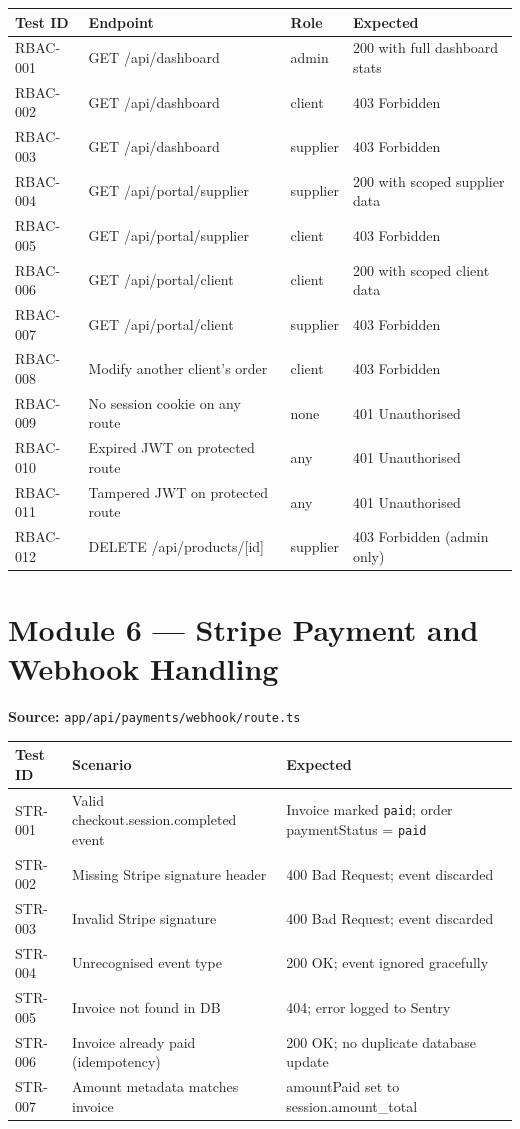 \documentclass[12pt,a4paper]{report}
\begin{document}
\begin{longtable}{p{}p{}p{}p{}}
    \toprule
    \textbf{Test ID} & \textbf{Endpoint} & \textbf{Role} & \textbf{Expected} \\
    \midrule
    \endhead
    RBAC-001 & GET /api/dashboard & admin & 200 with full dashboard stats \\
    RBAC-002 & GET /api/dashboard & client & 403 Forbidden \\
    RBAC-003 & GET /api/dashboard & supplier & 403 Forbidden \\
    RBAC-004 & GET /api/portal/supplier & supplier & 200 with scoped supplier data \\
    RBAC-005 & GET /api/portal/supplier & client & 403 Forbidden \\
    RBAC-006 & GET /api/portal/client & client & 200 with scoped client data \\
    RBAC-007 & GET /api/portal/client & supplier & 403 Forbidden \\
    RBAC-008 & Modify another client's order & client & 403 Forbidden \\
    RBAC-009 & No session cookie on any route & none & 401 Unauthorised \\
    RBAC-010 & Expired JWT on protected route & any & 401 Unauthorised \\
    RBAC-011 & Tampered JWT on protected route & any & 401 Unauthorised \\
    RBAC-012 & DELETE /api/products/[id] & supplier & 403 Forbidden (admin only) \\
    \bottomrule
\end{longtable}

\section{Module 6 --- Stripe Payment and Webhook Handling}

\textbf{Source:} \texttt{app/api/payments/webhook/route.ts}

\begin{longtable}{p{}p{}p{}}
    \toprule
    \textbf{Test ID} & \textbf{Scenario} & \textbf{Expected} \\
    \midrule
    \endhead
    STR-001 & Valid checkout.session.completed event & Invoice marked \texttt{paid}; order paymentStatus = \texttt{paid} \\
    STR-002 & Missing Stripe signature header & 400 Bad Request; event discarded \\
    STR-003 & Invalid Stripe signature & 400 Bad Request; event discarded \\
    STR-004 & Unrecognised event type & 200 OK; event ignored gracefully \\
    STR-005 & Invoice not found in DB & 404; error logged to Sentry \\
    STR-006 & Invoice already paid (idempotency) & 200 OK; no duplicate database update \\
    STR-007 & Amount metadata matches invoice & amountPaid set to session.amount\_total \\
    \bottomrule
\end{longtable}
\end{document}
